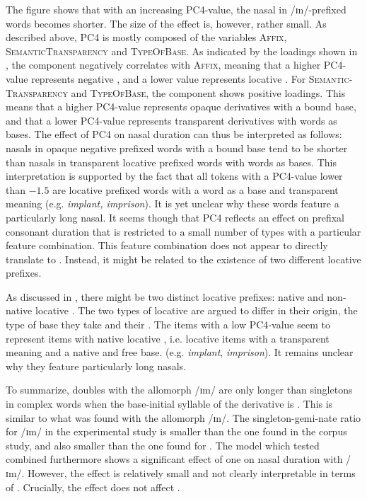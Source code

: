 The figure shows that with an increasing \textsc{PC4}-value, the nasal in /ɪn/-prefixed words becomes shorter. The size of the effect is, however, rather small. 
As described above, \textsc{PC4} is mostly composed of the variables \textsc{Affix}, \textsc{SemanticTransparency} and \textsc{TypeOfBase}. As indicated by the loadings shown in , the component negatively correlates with \textsc{Affix}, meaning that a higher \textsc{PC4}-value represents negative , and a lower value represents locative . For \textsc{Semantic- Transparency} and \textsc{TypeOfBase}, the component shows positive loadings. This means that a higher \textsc{PC4}-value represents opaque derivatives with a bound base, and that a lower \textsc{PC4}-value represents transparent derivatives with words as bases.
The effect of \textsc{PC4} on nasal duration can thus be interpreted as follows: nasals in opaque negative prefixed words with a bound base tend to be shorter than nasals in transparent locative prefixed words with words as bases. This interpretation is supported by the fact that all tokens with a \textsc{PC4}-value lower than $-1.5$ are locative prefixed words with a word as a base and transparent meaning (e.g. \textit{implant, imprison}). It is yet unclear why these words feature a particularly long nasal. 
It seems though that \textsc{PC4} reflects an effect on prefixal consonant duration that is restricted to a small number of types with a particular feature combination. This feature combination does not appear to directly translate to .  
Instead, it might be related to the existence of two different locative prefixes. 

As discussed in , there might be two distinct locative prefixes: native and non-native locative . The two types of locative  are argued to differ in their origin, the type of base they take and their . The items with a low \textsc{PC4}-value seem to represent items with native locative , i.e. locative items with a transparent meaning and a native and free base. (e.g. \textit{implant}, \textit{imprison}). It remains unclear why they feature particularly long nasals.



To summarize,  doubles with the allomorph /ɪm/ are only longer than singletons in complex words when the base-initial syllable of the derivative is . This is similar to what was found with the allomorph /ɪn/. The singleton-gemi-nate ratio for /ɪm/ in the experimental study is smaller than the one found in the corpus study, and also smaller than the one found for . 
The model which tested combined  furthermore shows a significant effect of one  on nasal duration with /ɪm/. However, the effect is relatively small and not clearly interpretable in terms of . Crucially, the effect does not affect .





